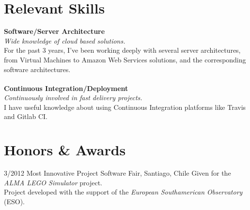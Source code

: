 \documentclass[]{friggeri-cv}
\begin{document}
\section{Relevant Skills}
\textbf{Software/Server Architecture}\\
\emph{Wide knowledge of cloud based solutions.}\\
For the past 3 years, I've been working deeply with several server architectures, from Virtual Machines to Amazon Web Services solutions, and the corresponding software architectures.\\
\\
\textbf{Continuous Integration/Deployment}\\
\emph{Continuously involved in fast delivery projects.}\\
I have useful knowledge about using Continuous Integration platforms like Travis and Gitlab CI.
\\
\section{Honors \& Awards}
\begin{entrylist}
  \entry
    {3/2012}
    {Most Innovative Project}
    {Software Fair, Santiago, Chile}
    {Given for the \emph{ALMA LEGO Simulator} project.\\
    Project developed with the support of the \emph{European Southamerican Observatory} (ESO).}
\end{entrylist}
\end{document}

